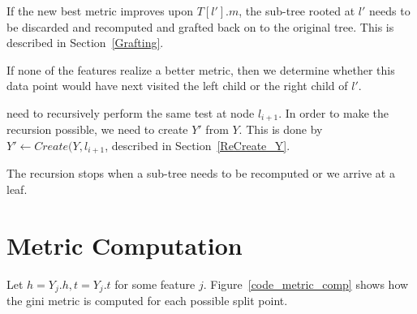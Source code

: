 \documentclass[12pt,letterpaper]{article}
\begin{document}
If the new best metric improves upon \(T[l'].m\), 
the sub-tree rooted at \(l'\) needs to be discarded and recomputed and grafted
back on to the original tree. This is described in Section~\ref{Grafting}.

If none of the features realize a better metric, then we determine whether this
data point would have next visited the left child or the right child of \(l'\). 

need to recursively
perform the same test at node \(l_{i+1}\). 
In order to make the recursion possible, we need to
create \(Y'\) from \(Y\). This is done by 
\(Y' \leftarrow Create(Y, l_{i+1}\), described in Section~\ref{ReCreate_Y}.

The recursion stops when a sub-tree needs to be recomputed or we arrive at a
leaf. 

\section{Metric Computation}
\label{Metric_Computation}

Let \(h = Y_j.h, t = Y_j.t\) for some feature \(j\). 
Figure~\ref{code_metric_comp} shows how
the gini metric is computed for each possible split point. 
\begin{figure}
\centering
{}
\end{figure}
\end{document}

